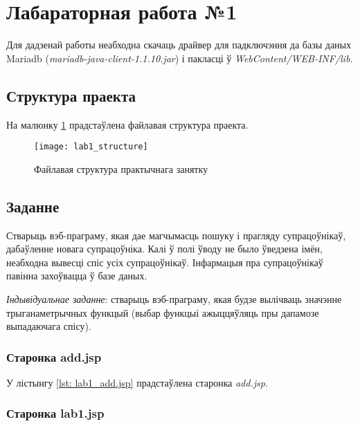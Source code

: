 \section{Лабараторная работа №1}

Для дадзенай работы неабходна скачаць драйвер для падключэння да
базы даных Mariadb (\textit{mariadb-java-client-1.1.10.jar}) і
пакласці ў \textit{WebContent/WEB-INF/lib}.

\subsection{Структура праекта}

На малюнку \ref{img: lab1} прадстаўлена файлавая структура праекта.

\begin{figure}[h!]
    \centering
    \texttt{[image: lab1\_structure]}
    \caption{Файлавая структура практычнага занятку}
    \label{img: lab1} 
\end{figure}

\subsection{Заданне}

Стварыць вэб-праграму, якая дае магчымасць пошуку і прагляду супрацоўнікаў,
дабаўленне новага супрацоўніка.
Калі ў полі ўводу не было ўведзена імён, неабходна вывесці спіс
усіх супрацоўнікаў.
Інфармацыя пра супрацоўнікаў павінна захоўвацца ў базе даных.

\textit{Індывідуальнае заданне}: стварыць вэб-праграму, якая
будзе вылічваць значэнне трыганаметрычных функцый (выбар функцыі
ажыццяўляць пры дапамозе выпадаючага спісу).

\subsubsection{Старонка add.jsp}

У лістынгу \ref{lst: lab1_add.jsp} прадстаўлена старонка 
\textit{add.jsp}.



\subsubsection{Старонка lab1.jsp}

